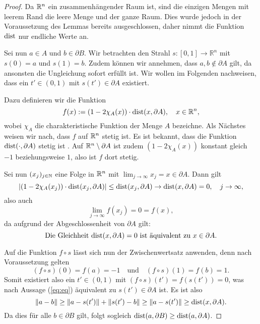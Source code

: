 \begin{proof}
  Da $\mathbb{R}^n$ ein zusammenhängender Raum ist, sind die einzigen Mengen mit leerem Rand die leere Menge und der ganze Raum.
  Dies wurde jedoch in der Voraussetzung des Lemmas bereits ausgeschlossen, daher nimmt die Funktion $\operatorname{dist}$ nur endliche Werte an.

  Sei nun $a \in A$ und $b \in \partial B$.
  Wir betrachten den Strahl $s \colon [0,1] \to \mathbb{R}^n$ mit $s(0) = a$ und $s(1) = b$.
  Zudem können wir annehmen, dass $a,b \not\in \partial A$ gilt, da ansonsten die Ungleichung sofort erfüllt ist.
  Wir wollen im Folgenden nachweisen, dass ein $t' \in (0,1)$ mit $s(t') \in \partial A$ existiert.

  Dazu definieren wir die Funktion
  $$
  f(x) := (1 - 2\chi_A(x)) \cdot \operatorname{dist}(x, \partial A), \quad x \in \mathbb{R}^n,
  $$
  wobei $\chi_A$ die charakteristische Funktion der Menge $A$ bezeichne.
  Als Nächstes weisen wir nach, dass $f$ auf $\mathbb{R}^n$ stetig ist.
  Es ist bekannt, dass die Funktion $\operatorname{dist}(\cdot, \partial A)$ stetig ist \cite[S.14]{koenigsberger2004ana2}.
  Auf $\mathbb{R}^n \setminus \partial A$ ist zudem $(1 - 2\chi_A(x))$ konstant gleich $-1$ beziehungsweise $1$, also ist $f$ dort stetig.

  Sei nun $(x_j)_{j \in \mathbb{N}}$ eine Folge in $\mathbb{R}^n$ mit $\lim_{j \to \infty} x_j = x \in \partial A$.
  Dann gilt
  $$
  |(1 - 2\chi_A(x_j)) \cdot \operatorname{dist}(x_j, \partial A)| 
  \leq \operatorname{dist}(x_j,\partial A)
  \to \operatorname{dist}(x,\partial A) 
  = 0,
  \quad j \to \infty,
  $$
  also auch 
  $$
  \lim_{j \to \infty} f(x_j) = 0 = f(x),
  $$
  da aufgrund der Abgeschlossenheit von $\partial A$ gilt:
  \begin{equation}
    \label{eq:eq}
    \text{Die Gleichheit $\operatorname{dist}(x,\partial A) = 0$ ist äquivalent zu $x \in \partial A$}.
  \end{equation}

  Auf die Funktion $f \circ s$ lässt sich nun der Zwischenwertsatz anwenden, denn nach Voraussetzung gelten
  $$
  (f \circ s)(0) = f(a) = -1 \quad\text{und}\quad (f \circ s)(1) = f(b) = 1.
  $$
  Somit existiert also ein $t' \in (0,1)$ mit $(f\circ s)(t') = f(s(t')) = 0$, was nach Aussage (\ref{eq:eq}) äquivalent zu $s(t') \in \partial A$ ist.
  Es ist also
  $$
  \lVert a - b \rVert \geq \lVert a - s(t') \rVert + \lVert s(t') - b \rVert \geq \lVert a - s(t') \rVert \geq \operatorname{dist}(x,\partial A).
  $$
  Da dies für alle $b \in \partial B$ gilt, folgt sogleich $ \operatorname{dist}(a, \partial B) \geq \operatorname{dist}(a, \partial A)$.
\end{proof}

